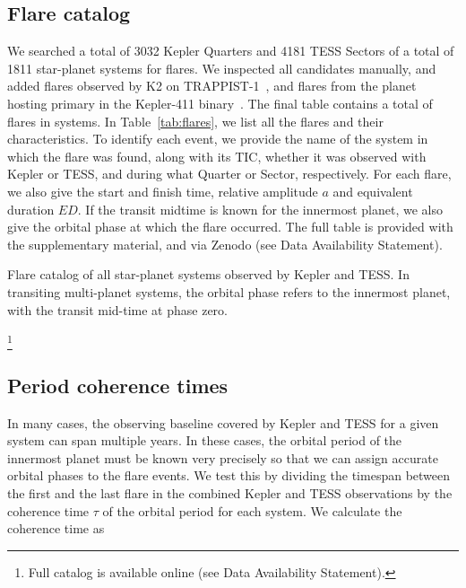 \documentclass[twocolumn]{aastex631}
\begin{document}
\subsection{Flare catalog}
\label{sec:results:catalog}
We searched a total of 3032 Kepler Quarters and 4181 TESS Sectors of a total of 1811 star-planet systems for flares. We inspected all candidates manually, and added flares observed by K2 on TRAPPIST-1~\cite{paudel2018k2}, and flares from the planet hosting primary in the Kepler-411 binary~\cite{jackman2021stellara}. The final table contains a total of  flares in  systems. In Table~\ref{tab:flares}, we list all the flares and their characteristics. To identify each event, we provide the name of the system in which the flare was found, along with its TIC, whether it was observed with Kepler or TESS, and during what Quarter or Sector, respectively. For each flare, we also give the start and finish time, relative amplitude $a$ and equivalent duration $ED$. If the transit midtime is known for the innermost planet, we also give the orbital phase at which the flare occurred. The full table is provided with the supplementary material, and via Zenodo (see Data Availability Statement).

\begin{table*}
    \centering
            \caption{
            Flare catalog of all star-planet systems observed by Kepler and TESS. In transiting multi-planet systems, the orbital phase refers to the innermost planet, with the transit mid-time at phase zero. 
        }
    \footnote{Full catalog is available online (see Data Availability Statement).}
    
        \label{tab:flares}
\end{table*}

\subsection{Period coherence times}
\label{sec:results:coherence}
In many cases, the observing baseline covered by Kepler and TESS for a given system can span multiple years. In these cases, the orbital period of the innermost planet must be known very precisely so that we can assign accurate orbital phases to the flare events.
We test this by dividing the timespan between the first and the last flare in the combined Kepler and TESS observations by the coherence time $\tau$ of the orbital period for each system. We calculate the coherence time as
\end{document}
